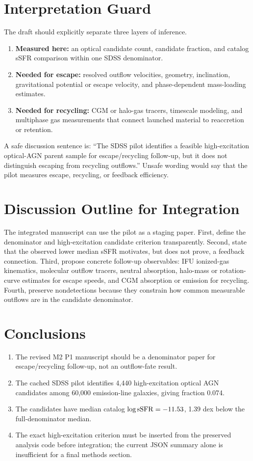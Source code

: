 \documentclass[twocolumn]{aastex631}
\begin{document}
\section{Interpretation Guard}\label{sec:guard}
The draft should explicitly separate three layers of inference.
\begin{enumerate}
\item \textbf{Measured here:} an optical candidate count, candidate fraction, and catalog sSFR comparison within one SDSS denominator.
\item \textbf{Needed for escape:} resolved outflow velocities, geometry, inclination, gravitational potential or escape velocity, and phase-dependent mass-loading estimates.
\item \textbf{Needed for recycling:} CGM or halo-gas tracers, timescale modeling, and multiphase gas measurements that connect launched material to reaccretion or retention.
\end{enumerate}

A safe discussion sentence is: ``The SDSS pilot identifies a feasible high-excitation optical-AGN parent sample for escape/recycling follow-up, but it does not distinguish escaping from recycling outflows.''  Unsafe wording would say that the pilot measures escape, recycling, or feedback efficiency.

\section{Discussion Outline for Integration}\label{sec:discussion}
The integrated manuscript can use the pilot as a staging paper.  First, define the denominator and high-excitation candidate criterion transparently.  Second, state that the observed lower median sSFR motivates, but does not prove, a feedback connection.  Third, propose concrete follow-up observables: IFU ionized-gas kinematics, molecular outflow tracers, neutral absorption, halo-mass or rotation-curve estimates for escape speeds, and CGM absorption or emission for recycling.  Fourth, preserve nondetections because they constrain how common measurable outflows are in the candidate denominator.

\section{Conclusions}\label{sec:conclusions}
\begin{enumerate}
\item The revised M2 P1 manuscript should be a denominator paper for escape/recycling follow-up, not an outflow-fate result.
\item The cached SDSS pilot identifies 4,440 high-excitation optical AGN candidates among 60,000 emission-line galaxies, giving fraction 0.074.
\item The candidates have median catalog $\log {\rm sSFR}=-11.53$, 1.39 dex below the full-denominator median.
\item The exact high-excitation criterion must be inserted from the preserved analysis code before integration; the current JSON summary alone is insufficient for a final methods section.
\end{enumerate}
\end{document}
